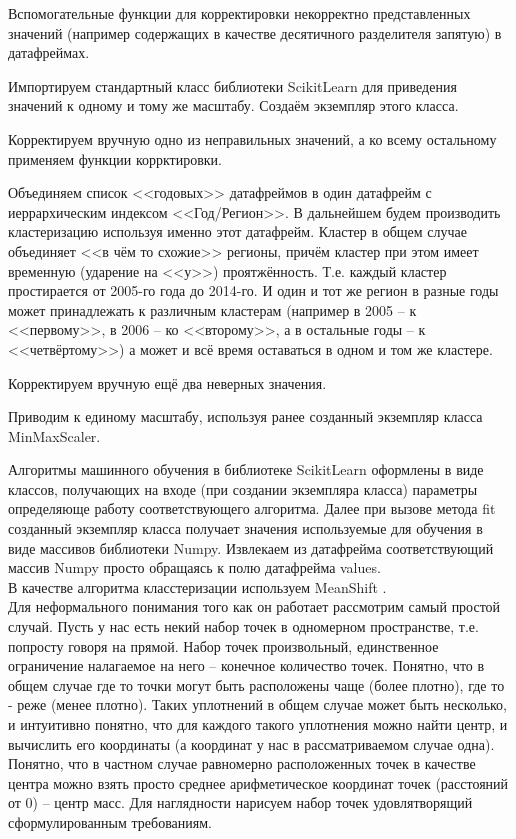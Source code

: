 \documentclass[11pt]{article}
\begin{document}
    Вспомогательные функции для корректировки некорректно представленных
значений (например содержащих в качестве десятичного разделителя
запятую) в датафреймах.

    Импортируем стандартный класс библиотеки ScikitLearn для приведения
значений к одному и тому же масштабу. Создаём экземпляр этого класса.


    Корректируем вручную одно из неправильных значений, а ко всему
остальному применяем функции коррктировки.


    Объединяем список <<годовых>> датафреймов в один датафрейм с
иеррархическим индексом <<Год/Регион>>. В дальнейшем будем
производить кластеризацию используя именно этот датафрейм. Кластер в
общем случае объединяет <<в чём то схожие>> регионы, причём кластер
при этом имеет временную (ударение на <<у>>) проятжённость. Т.е.
каждый кластер простирается от 2005-го года до 2014-го. И один и тот же
регион в разные годы может принадлежать к различным кластерам (например
в 2005 -- к <<первому>>, в 2006 -- ко <<второму>>, а в остальные
годы -- к <<четвёртому>>) а может и всё время оставаться в одном и
том же кластере.

    Корректируем вручную ещё два неверных значения.

    Приводим к единому масштабу, используя ранее созданный экземпляр класса
MinMaxScaler.


    Алгоритмы машинного обучения в библиотеке ScikitLearn оформлены в виде
классов, получающих на входе (при создании экземпляра класса) параметры
определяюще работу соответствующего алгоритма. Далее при вызове метода
fit созданный экземпляр класса получает значения используемые для
обучения в виде массивов библиотеки Numpy. Извлекаем из датафрейма
соответствующий массив Numpy просто обращаясь к полю датафрейма values.
\\ В качестве алгоритма класстеризации используем MeanShift
\cite{litlink2} \cite{litlink5}. \\ Для неформального
понимания того как он работает рассмотрим самый простой случай. Пусть у
нас есть некий набор точек в одномерном пространстве, т.е. попросту
говоря на прямой. Набор точек произвольный, единственное ограничение
налагаемое на него -- конечное количество точек. Понятно, что в общем
случае где то точки могут быть расположены чаще (более плотно), где то -
реже (менее плотно). Таких уплотнений в общем случае может быть
несколько, и интуитивно понятно, что для каждого такого уплотнения можно
найти центр, и вычислить его координаты (а координат у нас в
рассматриваемом случае одна). Понятно, что в частном случае равномерно
расположенных точек в качестве центра можно взять просто среднее
арифметическое координат точек (расстояний от 0) -- центр масс. Для
наглядности нарисуем набор точек удовлятворящий сформулированным
требованиям.
\end{document}
